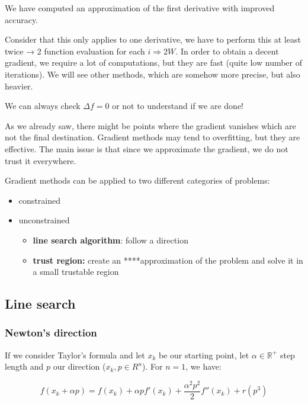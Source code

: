 We have computed an approximation of the first derivative with improved
accuracy.

Consider that this only applies to one derivative, we have to perform
this at least twice → 2 function evaluation for each $i \Rightarrow 2W$.
In order to obtain a decent gradient, we require a lot of computations,
but they are fast (quite low number of iterations). We will see other
methods, which are somehow more precise, but also heavier.

We can always check $\Delta f=0$ or not to understand if we are done!

As we already saw, there might be points where the gradient vanishes
which are not the final destination. Gradient methods may tend to
overfitting, but they are effective. The main issue is that since we
approximate the gradient, we do not trust it everywhere.

Gradient methods can be applied to two different categories of problems:

\begin{itemize}
\tightlist
\item
  constrained
\item
  unconstrained

  \begin{itemize}
  \tightlist
  \item
    \textbf{line search algorithm}: follow a direction
  \item
    \textbf{trust region:} create an ****approximation of the problem
    and solve it in a small trustable region
  \end{itemize}
\end{itemize}

\hypertarget{line-search}{%
\subsection{Line search}\label{line-search}}

\hypertarget{newtons-direction}{%
\subsubsection{Newton's direction}\label{newtons-direction}}

If we consider Taylor's formula and let $x_k$ be our starting point, let
$\alpha \in \mathbb{R}^+$ step length and $p$ our direction
($x_k, p \in R^n$). For $n=1$, we have:

$$
f(x_k+\alpha p)=f(x_k) + \alpha p f'(x_k) + \frac{\alpha^2p^2}{2} f''(x_k) + r(p^3)
$$

